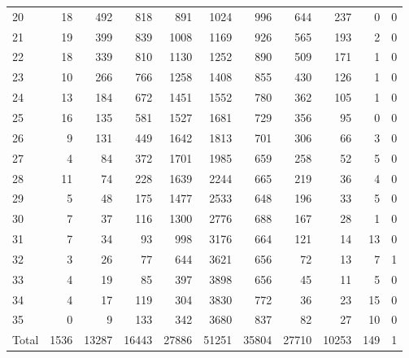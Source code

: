 \begin{table}
\begin{tabular}{lrrrrrrrrrr}
20 & 18 & 492 & 818 & 891 & 1024 & 996 & 644 & 237 & 0 & 0 \\
21 & 19 & 399 & 839 & 1008 & 1169 & 926 & 565 & 193 & 2 & 0 \\
22 & 18 & 339 & 810 & 1130 & 1252 & 890 & 509 & 171 & 1 & 0 \\
23 & 10 & 266 & 766 & 1258 & 1408 & 855 & 430 & 126 & 1 & 0 \\
24 & 13 & 184 & 672 & 1451 & 1552 & 780 & 362 & 105 & 1 & 0 \\
25 & 16 & 135 & 581 & 1527 & 1681 & 729 & 356 & 95 & 0 & 0 \\
26 & 9 & 131 & 449 & 1642 & 1813 & 701 & 306 & 66 & 3 & 0 \\
27 & 4 & 84 & 372 & 1701 & 1985 & 659 & 258 & 52 & 5 & 0 \\
28 & 11 & 74 & 228 & 1639 & 2244 & 665 & 219 & 36 & 4 & 0 \\
29 & 5 & 48 & 175 & 1477 & 2533 & 648 & 196 & 33 & 5 & 0 \\
30 & 7 & 37 & 116 & 1300 & 2776 & 688 & 167 & 28 & 1 & 0 \\
31 & 7 & 34 & 93 & 998 & 3176 & 664 & 121 & 14 & 13 & 0 \\
32 & 3 & 26 & 77 & 644 & 3621 & 656 & 72 & 13 & 7 & 1 \\
33 & 4 & 19 & 85 & 397 & 3898 & 656 & 45 & 11 & 5 & 0 \\
34 & 4 & 17 & 119 & 304 & 3830 & 772 & 36 & 23 & 15 & 0 \\
35 & 0 & 9 & 133 & 342 & 3680 & 837 & 82 & 27 & 10 & 0 \\
Total & 1536 & 13287 & 16443 & 27886 & 51251 & 35804 & 27710 & 10253 & 149 & 1 \\
\end{tabular}
\end{table}
